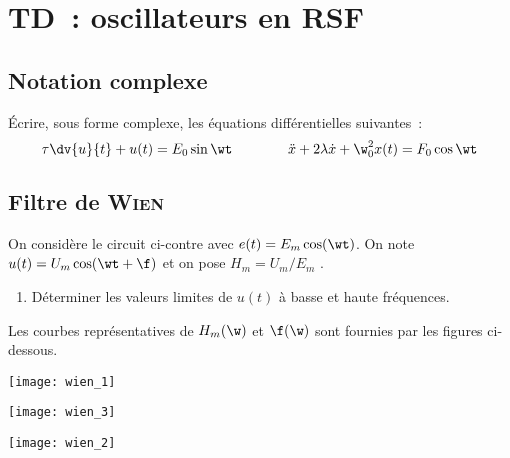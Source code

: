 \documentclass[a4paper, 12pt, final, garamond]{book}
\begin{document}
\setcounter{chapter}{5}

\chapter{TD~: oscillateurs en RSF}

\section{Notation complexe}

Écrire, sous forme complexe, les équations différentielles suivantes~:
\[\tau \dv{u}{t} + u(t) = E_0\sin\wt
\qquad \qquad
\ddot{x} +  2\lambda \dot x + \w_0^2 x(t) =F_0\cos\wt\]

\section{Filtre de \textsc{Wien}}

\begin{minipage}{0.45\linewidth}
    On considère le circuit ci-contre avec $e(t) = E_m \cos(\wt)$. On note
    $u(t) = U_m \cos(\wt + \f)$ et on pose $H_m = U_m / E_m$ .
    \begin{enumerate}
        \item Déterminer les valeurs limites de $u(t)$ à basse et haute
            fréquences.
    \end{enumerate}
    Les courbes représentatives de $H_m (\w)$ et $\f(\w)$ sont
    fournies par les figures ci-dessous.
\end{minipage}
\hfill
\begin{minipage}{0.45\linewidth}
    \begin{center}
        \texttt{[image: wien\_1]}
    \end{center}
\end{minipage}

\begin{minipage}{0.45\linewidth}
    \begin{center}
        \texttt{[image: wien\_3]}
    \end{center}
\end{minipage}
\hfill
\begin{minipage}{0.45\linewidth}
    \begin{center}
        \texttt{[image: wien\_2]}
    \end{center}
\end{minipage}
\end{document}
